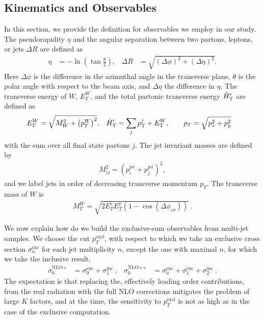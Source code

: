 \subsection{Kinematics and Observables}
\label{sec:kin}
In this section, we provide the definition for observables we employ in our study.
The pseudorapidity $\eta$ and the
angular separation between two partons, leptons, or jets $\Delta R$ are defined as
\begin{align}
  \eta &= -\ln\left(\tan\frac{\theta}{2}\right),&  \Delta R &= \sqrt{(\Delta \phi)^2+(\Delta \eta)^2}.
\end{align}
Here $\Delta\phi$ is the difference in the azimuthal angle in the transverse plane,
$\theta$ is the polar angle with respect to the beam axis, and
$\Delta\eta$ the difference in $\eta$. 
The transverse energy of $W$, $E_T^W$, and the total partonic transverse energy ${\hat H}_{\mathrm T}'$ are defined as
\begin{align}\label{eq:htpart}
  E_T^W&=\sqrt{M_W^2+\left(p_T^W \right)^2},& {\hat H}_{\mathrm T}'&=\sum_j p_{\textrm T}^j+E_{\textrm T}^W, \qquad p_T=\sqrt{p_x^2+p_y^2}
\end{align}
with the sum over all final state partons $j$.
The jet invariant masses are defined by
\begin{align}
  M_{ij}^2 = \left(p_i^{\text{jet}}+p_j^{\text{jet}}\right)^2,
\end{align}
and we label  jets in order of decreasing transverse momentum $p_T$. 
The transverse mass of $W$ is
\begin{align}
  M_T^W=\sqrt{2E_T^eE_T^\nu(1-\cos(\Delta\phi_{e\nu}))}\ .
\end{align}

We now explain how do we build the exclusive-sum observables from multi-jet samples.
We choose the cut $p_{T}^{\text{excl}}$, with respect to which we take an exclusive cross section $\sigma^{\text{exc}}_n$
for each jet multiplicity $n$, except the one with maximal  $n$, for which we take the inclusive result,
\begin{align}\label{eq:excsums}
  \sigma^{\text{NLO+}}_0 &= \sigma^{\text{exc}}_0 + \sigma^{\text{inc}}_1\ , &
\sigma^{\text{NLO++}}_0 &= \sigma^{\text{exc}}_0 +\sigma^{\text{exc}}_1+
\sigma^{\text{inc}}_2\ .
\end{align}
The expectation is that replacing the, effectively leading order contributions, from the real radiation with the full NLO
corrections mitigates the problem of large $K$ factors, and at the time, the sensitivity to $p_{T}^{\text{excl}}$ is not as high 
as in the case of the exclusive computation.

